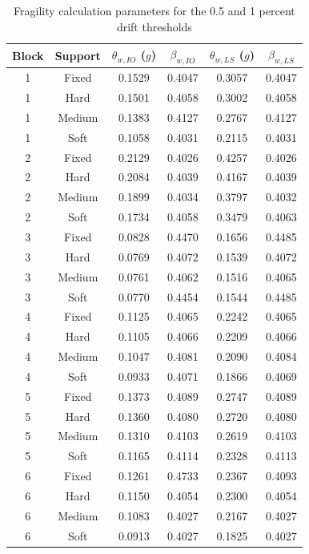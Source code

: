 \begin{table}[!htbp]
\fontsize{11}{13}\selectfont\setlength{\tabcolsep}{4pt}
\centering
\fontsize{11}{13}\selectfont\setlength{\tabcolsep}{4pt}\renewcommand{\arraystretch}{0.95}
\caption{Fragility calculation parameters for the 0.5 and 1 percent drift thresholds}\label{tab:seq066_frag_io_ls}\renewcommand{\arraystretch}{0.86}
\begin{tabular*}{\linewidth}{@{\extracolsep{\fill}}cccccc@{}}
\toprule
Block & Support & $\theta_{w,IO}$ ($g$) & $\beta_{w,IO}$ & $\theta_{w,LS}$ ($g$) & $\beta_{w,LS}$ \\
\midrule
1 & Fixed & 0.1529 & 0.4047 & 0.3057 & 0.4047 \\
1 & Hard & 0.1501 & 0.4058 & 0.3002 & 0.4058 \\
1 & Medium & 0.1383 & 0.4127 & 0.2767 & 0.4127 \\
1 & Soft & 0.1058 & 0.4031 & 0.2115 & 0.4031 \\
2 & Fixed & 0.2129 & 0.4026 & 0.4257 & 0.4026 \\
2 & Hard & 0.2084 & 0.4039 & 0.4167 & 0.4039 \\
2 & Medium & 0.1899 & 0.4034 & 0.3797 & 0.4032 \\
2 & Soft & 0.1734 & 0.4058 & 0.3479 & 0.4063 \\
3 & Fixed & 0.0828 & 0.4470 & 0.1656 & 0.4485 \\
3 & Hard & 0.0769 & 0.4072 & 0.1539 & 0.4072 \\
3 & Medium & 0.0761 & 0.4062 & 0.1516 & 0.4065 \\
3 & Soft & 0.0770 & 0.4454 & 0.1544 & 0.4485 \\
4 & Fixed & 0.1125 & 0.4065 & 0.2242 & 0.4065 \\
4 & Hard & 0.1105 & 0.4066 & 0.2209 & 0.4066 \\
4 & Medium & 0.1047 & 0.4081 & 0.2090 & 0.4084 \\
4 & Soft & 0.0933 & 0.4071 & 0.1866 & 0.4069 \\
5 & Fixed & 0.1373 & 0.4089 & 0.2747 & 0.4089 \\
5 & Hard & 0.1360 & 0.4080 & 0.2720 & 0.4080 \\
5 & Medium & 0.1310 & 0.4103 & 0.2619 & 0.4103 \\
5 & Soft & 0.1165 & 0.4114 & 0.2328 & 0.4113 \\
6 & Fixed & 0.1261 & 0.4733 & 0.2367 & 0.4093 \\
6 & Hard & 0.1150 & 0.4054 & 0.2300 & 0.4054 \\
6 & Medium & 0.1083 & 0.4027 & 0.2167 & 0.4027 \\
6 & Soft & 0.0913 & 0.4027 & 0.1825 & 0.4027 \\
\bottomrule
\end{tabular*}
\end{table}
